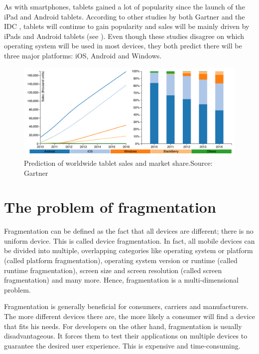 As with smartphones, tablets gained a lot of popularity since the launch of the iPad and Android tablets. According to other studies by both Gartner \citep{Gartner:11tab,Gartner:12tab} and the IDC \citep{IDC:tablet}, tablets will continue to gain popularity and sales will be mainly driven by iPads and Android tablets (see ). Even though these studies disagree on which operating system will be used in most devices, they both predict there will be three major platforms: iOS, Android and Windows. 

\begin{figure}[h]
    \centering
    \includegraphics[width=\textwidth]{../resources/figs/tablet_sales.pdf}
    \caption{Prediction of worldwide tablet sales and market share.\newline Source: Gartner \citeGartnerTab}
    \label{fig:tablet}
\end{figure}

\section{The problem of fragmentation}

Fragmentation can be defined as the fact that all devices are different; there is no uniform device. This is called device fragmentation. In fact, all mobile devices can be divided into multiple, overlapping categories like operating system or platform (called platform fragmentation), operating system version or runtime (called runtime fragmentation), screen size and screen resolution (called screen fragmentation) and many more. Hence, fragmentation is a multi-dimensional problem. 

Fragmentation is generally beneficial for consumers, carriers and manufacturers. The more different devices there are, the more likely a consumer will find a device that fits his needs. For developers on the other hand, fragmentation is usually disadvantageous. It forces them to test their applications on multiple devices to guarantee the desired user experience. This is expensive and time-consuming. 

